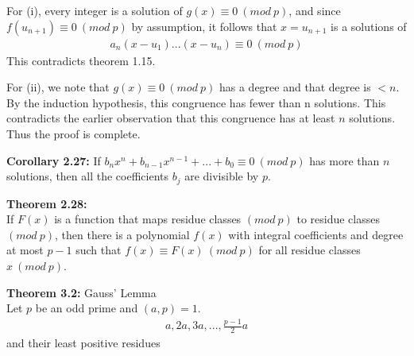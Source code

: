 \documentclass[a4paper]{article}
\begin{document}
For (i), every integer is a solution of $g(x)\equiv 0\ (mod\ p)$, and since
$f(u_{n+1})\equiv 0\ (mod\ p)$ by assumption, it follows that $x=u_{n+1}$ is a
solutions of
\begin{align}
    a_n(x-u_1)...(x-u_n)\equiv 0\ (mod\ p)
\end{align}
This contradicts theorem 1.15.

For (ii), we note that $g(x)\equiv 0\ (mod\ p)$ has a degree and that degree is
$<n$. By the induction hypothesis, this congruence has fewer than n solutions. This
contradicts the earlier observation that this congruence has at least $n$ solutions.
Thus the proof is complete.

\textbf{Corollary 2.27:}
If $b_nx^n+b_{n-1}x^{n-1}+...+b_0\equiv 0\ (mod\ p)$ has more than $n$ solutions,
then all the coefficients $b_j$ are divisible by $p$.

\textbf{Theorem 2.28:}\\
If $F(x)$ is a function that maps residue classes $(mod\ p)$ to residue classes
$(mod\ p)$, then there is a polynomial $f(x)$ with integral coefficients and
degree at most $p-1$ such that $f(x)\equiv F(x)\ (mod\ p)$ for all residue
classes $x\ (mod\ p)$.

\textbf{Theorem 3.2:} Gauss' Lemma\\
Let $p$ be an odd prime and $(a,p)=1$.
\begin{align}
    a,2a,3a,...,\frac{p-1}{2}a
\end{align}
and their least positive residues
\end{document}
